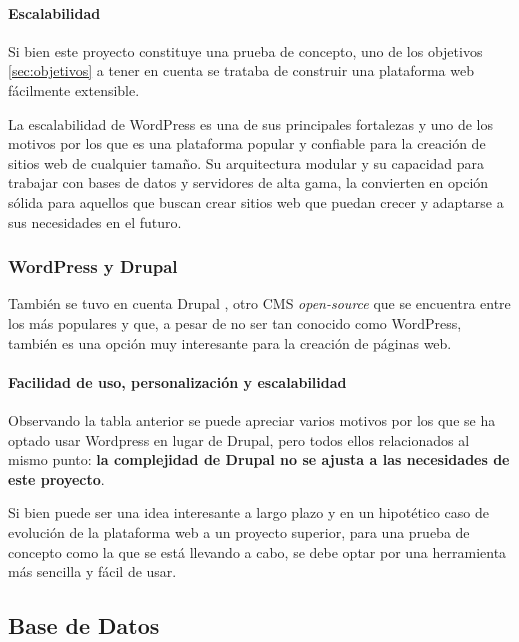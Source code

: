             \paragraph{Escalabilidad}
            
                Si bien este proyecto constituye una prueba de concepto, uno de los objetivos \ref{sec:objetivos} a tener en cuenta se trataba de construir una plataforma web fácilmente extensible.

                La escalabilidad de WordPress es una de sus principales fortalezas y uno de los motivos por los que es una plataforma popular y confiable para la creación de sitios web de cualquier tamaño. Su arquitectura modular y su capacidad para trabajar con bases de datos y servidores de alta gama, la convierten en opción sólida para aquellos que buscan crear sitios web que puedan crecer y adaptarse a sus necesidades en el futuro.


            \subsubsection{WordPress y Drupal}

                También se tuvo en cuenta Drupal \cite{drupal}, otro CMS \textit{open-source} que se encuentra entre los más populares y que, a pesar de no ser tan conocido como WordPress, también es una opción muy interesante para la creación de páginas web.

                \paragraph{Facilidad de uso, personalización y escalabilidad}
                
                    Observando la tabla anterior se puede apreciar varios motivos por los que se ha optado usar Wordpress en lugar de Drupal, pero todos ellos relacionados al mismo punto: \textbf{la complejidad de Drupal no se ajusta a las necesidades de este proyecto}.
    
                    Si bien puede ser una idea interesante a largo plazo y en un hipotético caso de evolución de la plataforma web a un proyecto superior, para una prueba de concepto como la que se está llevando a cabo, se debe optar por una herramienta más sencilla y fácil de usar.
    
                    \newpage
    

        \subsection{Base de Datos}
        

